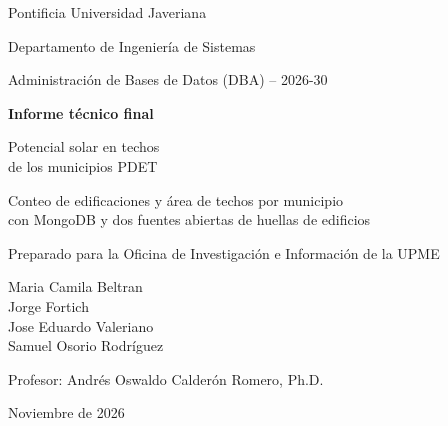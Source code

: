 \documentclass[11pt,a4paper]{article}
\begin{document}
\begin{titlepage}
  \centering
  {\large Pontificia Universidad Javeriana\par}
  {\large Departamento de Ingeniería de Sistemas\par}
  \vspace{0.8cm}
  {\large Administración de Bases de Datos (DBA) -- 2026-30\par}
  \vspace{2.2cm}
  {\Huge\bfseries Informe técnico final\par}
  \vspace{1cm}
  {\LARGE Potencial solar en techos\\ de los municipios PDET\par}
  \vspace{0.8cm}
  {\large Conteo de edificaciones y área de techos por municipio\\
  con MongoDB y dos fuentes abiertas de huellas de edificios\par}
  \vspace{0.6cm}
  {\large Preparado para la Oficina de Investigación e Información de la UPME\par}
  \vspace{2.2cm}
  {\large
    Maria Camila Beltran \\
    \vspace{0.5cm}
    Jorge Fortich \\
    \vspace{0.5cm}
    Jose Eduardo Valeriano \\
    \vspace{0.5cm}
    Samuel Osorio Rodríguez\par}
  \vspace{2.2cm}
  {\large Profesor: Andrés Oswaldo Calderón Romero, Ph.D.\par}
  \vspace{1.5cm}
  {\large Noviembre de 2026\par}
\end{titlepage}



\tableofcontents
\newpage












\end{document}
